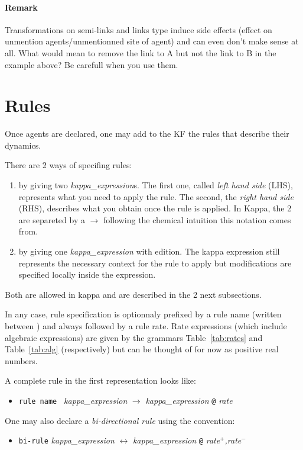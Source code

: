 \documentclass[11pt]{book}
\def\ttt#1{\texttt{#1}}
\def\rar{\rightarrow}
\def\lrar{\leftrightarrow}
\def\ITE#1{\begin{itemize}#1\end{itemize}}
\def\imp#1{\emph{#1}\index{#1}}
\newcommand{\Remark}{\paragraph{Remark}}
\begin{document}
\Remark{Transformations on semi-links and links type induce side
  effects (effect on unmention agents/unmentionned site of agent) and
  can even don't make sense at all. What would mean to remove the link
  to A but not the link to B in the example above? Be carefull when
  you use them.}

\section{Rules}\label{sec:rules}

Once agents are declared, one may add to the KF the
rules that describe their dynamics.

There are 2 ways of specifing rules:
\begin{enumerate}
  \item by giving two {\it kappa\_expression}s. The first one, called
    \emph{left hand side} (LHS), represents what
    you need to apply the rule. The second, the \emph{right hand
      side} (RHS), describes what you obtain
    once the rule is applied. In Kappa, the 2 are separeted by a
    $\rar$ following the chemical intuition this notation comes from.
  \item by giving one {\it kappa\_expression} with edition. The kappa
    expression still represents the necessary context for the rule to
    apply but modifications are specified locally inside the expression.
\end{enumerate}

Both are allowed in kappa and are described in the 2 next subsections.

In any case, rule specification is optionnaly prefixed by a rule name
(written between \textquotesingle) and always followed by a rule rate.
Rate expressions (which include algebraic expressions) are given by the grammars Table~\ref{tab:rates} and
Table~\ref{tab:alg} (respectively) but can be thought of for now as
positive real numbers.

A complete rule in the first representation looks like:

\ITE{
\item[] \ttt{{\textquotesingle}rule name{\textquotesingle} } {\it
  kappa\_expression} $\rar$ {\it kappa\_expression} \ttt{@} {\it rate}
}

One may also
declare a \imp{bi-directional rule} using the convention:

\ITE{
\item[] \ttt{{\textquotesingle}bi-rule{\textquotesingle}} {\it kappa\_expression} $\lrar$ {\it kappa\_expression} \ttt{@} {\it rate$^+$,rate$^-$}
}
\end{document}
